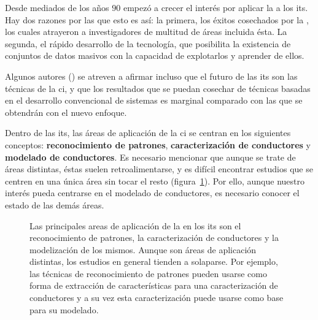 Desde mediados de los años $90$ empezó a crecer el interés por aplicar la  a los \gls{its}. Hay dos razones por las que esto es así: la primera, los éxitos cosechados por la , los cuales atrayeron a investigadores de multitud de áreas incluida ésta. La segunda, el rápido desarrollo de la tecnología, que posibilita la existencia de conjuntos de datos masivos con la capacidad de explotarlos y aprender de ellos.

Algunos autores (\cite{Zhang2011}) se atreven a afirmar incluso que el futuro de las \gls{its} son las técnicas de la \gls{ci}, y que los resultados que se puedan cosechar de técnicas basadas en el desarrollo convencional de sistemas es marginal comparado con las que se obtendrán con el nuevo enfoque.

Dentro de las \gls{its}, las áreas de aplicación de la \gls{ci} se centran en los siguientes conceptos: \textbf{reconocimiento de patrones}, \textbf{caracterización de conductores} y \textbf{modelado de conductores}. Es necesario mencionar que aunque se trate de áreas distintas, éstas suelen retroalimentarse, y es difícil encontrar estudios que se centren en una única área sin tocar el resto (figura~\ref{fig:main-applications-of-ci-in-its}). Por ello, aunque nuestro interés pueda centrarse en el modelado de conductores, es necesario conocer el estado de las demás áreas.

\begin{figure}[t]
	\centering
	\caption[Principales areas de aplicación de la  en los \gls{its}]{Las principales areas de aplicación de la  en los \gls{its} son el reconocimiento de patrones, la caracterización de conductores y la modelización de los mismos. Aunque son áreas de aplicación distintas, los estudios en general tienden a solaparse. Por ejemplo, las técnicas de reconocimiento de patrones pueden usarse como forma de extracción de características para una caracterización de conductores y a su vez esta caracterización puede usarse como base para su modelado.}
	\label{fig:main-applications-of-ci-in-its}
\end{figure}


